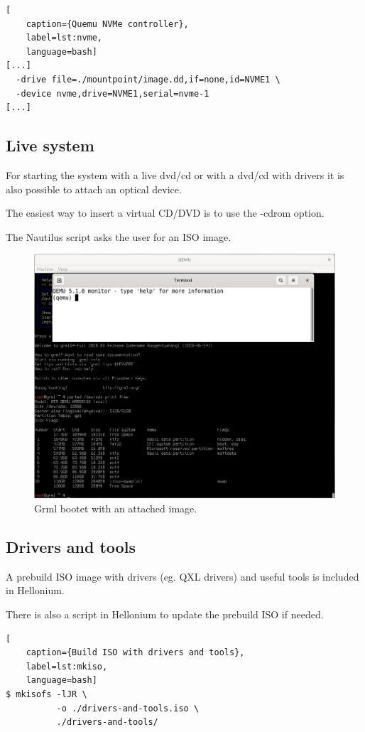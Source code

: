 \begin{lstlisting}[
    caption={Quemu NVMe controller},
    label=lst:nvme,
    language=bash]
[...]
  -drive file=./mountpoint/image.dd,if=none,id=NVME1 \
  -device nvme,drive=NVME1,serial=nvme-1
[...]
\end{lstlisting}

\subsection{Live system}

For starting the system with a live dvd/cd or with a dvd/cd with drivers it is also possible to attach an optical device.

The easiest way to insert a virtual CD/DVD is to use the \glqq{}-cdrom\grqq{} option.

The Nautilus script asks the user for an ISO image.

\begin{figure}[htbp]  %
  \centering
  \includegraphics[width=.75\textwidth]{figures/boot-cdrom-grml.png}
  \caption[Qemu with CD/DVD]{Grml bootet with an attached image.}
  \label{fig:cdrom}
\end{figure}

\subsection{Drivers and tools}

A prebuild ISO image with drivers (eg.  QXL drivers) and useful tools is included in Hellonium.

There is also a script in Hellonium to update the prebuild ISO if needed.

\begin{lstlisting}[
    caption={Build ISO with drivers and tools},
    label=lst:mkiso,
    language=bash]
$ mkisofs -lJR \
          -o ./drivers-and-tools.iso \
          ./drivers-and-tools/
\end{lstlisting}

